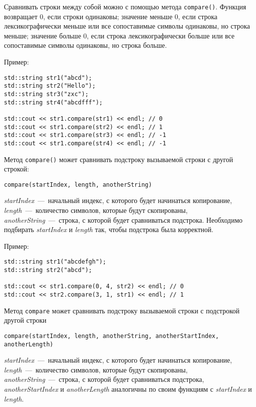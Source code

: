 Сравнивать строки между собой можно с помощью метода \lstinline|compare()|. Функция возвращает 0, если строки одинаковы; значение меньше 0, если строка лексикографически меньше или все сопоставимые символы одинаковы, но строка меньше; значение больше 0, если строка лексикографически больше или все сопоставимые символы одинаковы, но строка больше.

Пример:

\begin{lstlisting}
std::string str1("abcd");
std::string str2("Hello");
std::string str3("zxc");
std::string str4("abcdfff");

std::cout << str1.compare(str1) << endl; // 0
std::cout << str1.compare(str2) << endl; // 1
std::cout << str1.compare(str3) << endl; // -1
std::cout << str1.compare(str4) << endl; // -1
\end{lstlisting}

Метод \lstinline|compare()| может сравнивать подстроку вызываемой строки с другой строкой:
\begin{lstlisting}
compare(startIndex, length, anotherString)
\end{lstlisting}

\textit{startIndex}~---~начальный индекс, с которого будет начинаться копирование, \textit{length}~---~количество символов, которые будут скопированы, \textit{anotherString}~---~строка, с которой будет сравниваться подстрока. Необходимо подбирать \textit{startIndex} и \textit{length} так, чтобы подстрока была корректной.

Пример:

\begin{lstlisting}
std::string str1("abcdefgh");
std::string str2("abcd");

std::cout << str1.compare(0, 4, str2) << endl; // 0
std::cout << str2.compare(3, 1, str1) << endl; // 1
\end{lstlisting}

Метод \lstinline|compare| может сравнивать подстроку вызываемой строки с подстрокой другой строки
\begin{lstlisting}
compare(startIndex, length, anotherString, anotherStartIndex, anotherLength)
\end{lstlisting}

\textit{startIndex}~---~начальный индекс, с которого будет начинаться копирование, \textit{length}~---~количество символов, которые будут скопированы, \textit{anotherString}~---~строка, с которой будет сравниваться подстрока, \textit{anotherStartIndex} и \textit{anotherLength} аналогичны по своим функциям с \textit{startIndex} и \textit{length}. 

